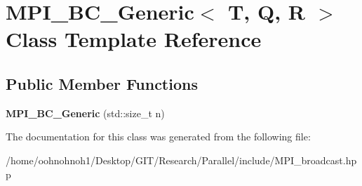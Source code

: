 \hypertarget{classMPI__BC__Generic}{}\section{M\+P\+I\+\_\+\+B\+C\+\_\+\+Generic$<$ T, Q, R $>$ Class Template Reference}
\label{classMPI__BC__Generic}
\subsection*{Public Member Functions}
\begin{DoxyCompactItemize}
\item 
\mbox{\label{classMPI__BC__Generic_a5259faca161859023e33e2e622f0a89b}} 
{\bfseries M\+P\+I\+\_\+\+B\+C\+\_\+\+Generic} (std\+::size\+\_\+t n)
\end{DoxyCompactItemize}


The documentation for this class was generated from the following file\+:\begin{DoxyCompactItemize}
\item 
/home/oohnohnoh1/\+Desktop/\+G\+I\+T/\+Research/\+Parallel/include/M\+P\+I\+\_\+broadcast.\+hpp\end{DoxyCompactItemize}
